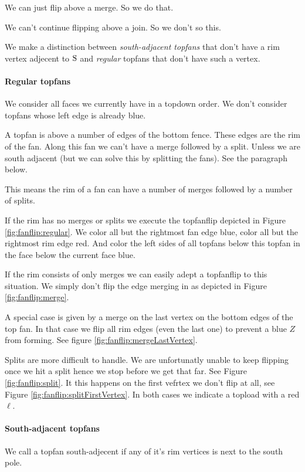 We can just flip above a merge. So we do that.

We can't continue flipping above a join. So we don't so this.

We make a distinction between \emph{south-adjacent topfans} that don't have a rim vertex adjecent to $\mathrm{S}$ and \emph{regular} topfans that don't have such a vertex.

\paragraph{Regular topfans}
We consider all faces we currently have in a topdown order. We don't consider topfans whose left edge is already blue. 

A topfan is above a number of edges of the bottom fence. These edges are the rim of the fan.  Along this fan we can't have a merge followed by a split. Unless we are south adjacent (but we can solve this by splitting the fans). See the paragraph below.

This means the rim of a fan can have a number of merges followed by a number of splits.

If the rim has no merges or splits we execute the topfanflip depicted in Figure \ref{fig:fanflip:regular}. We color all but the rightmost fan edge blue, color all but the rightmost rim edge red. And color the left sides of all topfans below this topfan in the face below the current face blue.

If the rim consists of only merges we can easily adept a topfanflip to this situation. We simply don't flip the edge merging in as depicted in Figure \ref{fig:fanflip:merge}.

A special case is given by a merge on the last vertex on the bottom edges of the top fan. In that case we flip all rim edges (even the last one) to prevent a blue $Z$ from forming. See figure \ref{fig:fanflip:mergeLastVertex}.

Splits are more difficult to handle. We are unfortunatly unable to keep flipping once we hit a split hence we stop before we get that far. See Figure \ref{fig:fanflip:split}. It this happens on the first vefrtex we don't flip at all, see Figure \ref{fig:fanflip:splitFirstVertex}. In both cases we indicate a topload with a red $\ell$.


\paragraph{South-adjacent topfans}
We call a topfan south-adjecent if any of it's rim vertices is next to the south pole.

